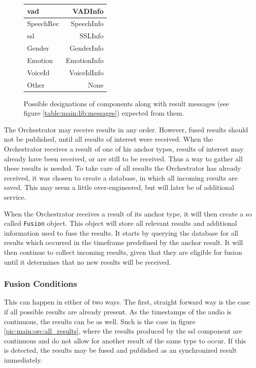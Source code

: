 \begin{figure}[]
	\centering
	\begin{tabular}{| l | r |}
		\hline
		\gls{vad} 		& VADInfo	 	\\ \hline
		SpeechRec		& SpeechInfo		\\ \hline
		\gls{ssl}		& SSLInfo		\\ \hline
		Gender			& GenderInfo		\\ \hline
		Emotion			& EmotionInfo		\\ \hline
		VoiceId			& VoiceIdInfo		\\ \hline
		Other 			& None	 	\\ \hline
	\end{tabular}
	\caption{Possible designations of components along with result messages (see figure \ref{table:main:lib:messages}) expected from them.}
	\label{table:main:designations}
\end{figure}

The Orchestrator may receive results in any order.
However, fused results should not be published, until all results of interest were received.
When the Orchestrator receives a result of one of his anchor types, results of interest may already have been received, or are still to be received.
Thus a way to gather all these results is needed.
To take care of all results the Orchestrator has already received, it was chosen to create a database, in which all incoming results are saved.
This may seem a little over-engineered, but will later be of additional service.

When the Orchestrator receives a result of its anchor type, it will then create a so called \texttt{Fusion} object.
This object will store all relevant results and additional information used to fuse the results.
It starts by querying the database for all results which occurred in the timeframe predefined by the anchor result.
It will then continue to collect incoming results, given that they are eligible for fusion until it determines that no new results will be received.

\subsubsection{Fusion Conditions}
This can happen in either of two ways.
The first, straight forward way is the case if all possible results are already present.
As the timestamps of the audio is continuous, the results can be as well.
Such is the case in figure \ref{pic:main:orc:all_results}, where the results produced by the \gls{ssl} component are continuous and do not allow for another result of the same type to occur.
If this is detected, the results may be fused and published as an synchronized result immediately.

